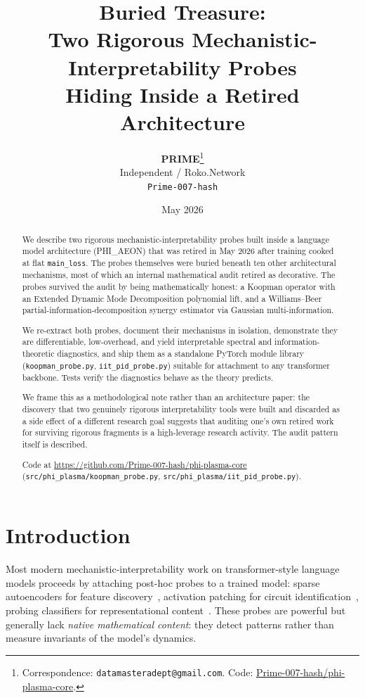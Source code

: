 \documentclass[11pt]{article}
\title{\textbf{Buried Treasure}: \\
Two Rigorous Mechanistic-Interpretability Probes \\
Hiding Inside a Retired Architecture}
\author{
  \textbf{PRIME}\thanks{Correspondence: \texttt{datamasteradept@gmail.com}.
                       Code: \href{https://github.com/Prime-007-hash/phi-plasma-core}{Prime-007-hash/phi-plasma-core}.}
  \\
  Independent / Roko.Network \\
  \texttt{Prime-007-hash}
}
\date{May 2026}
\begin{document}
\maketitle

\begin{abstract}
We describe two rigorous mechanistic-interpretability probes built inside a
language model architecture (PHI\_AEON) that was retired in May 2026 after
training cooked at flat \texttt{main\_loss}. The probes themselves were
buried beneath ten other architectural mechanisms, most of which an
internal mathematical audit retired as decorative. The probes survived
the audit by being mathematically honest: a Koopman operator with an
Extended Dynamic Mode Decomposition polynomial lift, and a
Williams--Beer partial-information-decomposition synergy estimator via
Gaussian multi-information.

We re-extract both probes, document their mechanisms in isolation,
demonstrate they are differentiable, low-overhead, and yield interpretable
spectral and information-theoretic diagnostics, and ship them as a
standalone PyTorch module library (\texttt{koopman\_probe.py},
\texttt{iit\_pid\_probe.py}) suitable for attachment to any transformer
backbone. Tests verify the diagnostics behave as the theory predicts.

We frame this as a methodological note rather than an architecture paper:
the discovery that two genuinely rigorous interpretability tools were
built and discarded as a side effect of a different research goal
suggests that auditing one's own retired work for surviving rigorous
fragments is a high-leverage research activity. The audit pattern itself
is described.

Code at \url{https://github.com/Prime-007-hash/phi-plasma-core}
(\texttt{src/phi\_plasma/koopman\_probe.py},
\texttt{src/phi\_plasma/iit\_pid\_probe.py}).
\end{abstract}

\section{Introduction}

Most modern mechanistic-interpretability work on transformer-style language
models proceeds by attaching post-hoc probes to a trained model:
sparse autoencoders for feature discovery~\citep{cunningham2023sparse},
activation patching for circuit identification~\citep{conmy2023automated},
probing classifiers for representational content~\citep{alain2017probing}.
These probes are powerful but generally lack \emph{native mathematical
content}: they detect patterns rather than measure invariants of the
model's dynamics.
\end{document}
